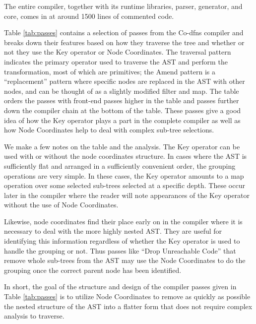 ﻿\documentclass[numbers,10pt,preprint]{sigplanconf}
\begin{document}
The entire compiler, together with its runtime libraries, parser, generator, and core, comes in at around 1500 lines of commented code.

Table \ref{tab:passes} contains a selection of passes from the Co-dfns compiler and breaks down their features based on how they traverse the tree and whether or not they use the Key operator or Node Coordinates. The traversal pattern indicates the primary operator used to traverse the AST and perform the transformation, most of which are primitives; the Amend pattern is a ``replacement'' pattern where specific nodes are replaced in the AST with other nodes, and can be thought of as a slightly modified filter and map. The table orders the passes with front-end passes higher in the table and passes further down the compiler chain at the bottom of the table. These passes give a good idea of how the Key operator plays a part in the complete compiler as well as how Node Coordinates help to deal with complex sub-tree selections.

We make a few notes on the table and the analysis. The Key operator can be used with or without the node coordinates structure. In cases where the AST is sufficiently flat and arranged in a sufficiently convenient order, the grouping operations are very simple. In these cases, the Key operator amounts to a map operation over some selected sub-trees selected at a specific depth. These occur later in the compiler where the reader will note appearances of the Key operator without the use of Node Coordinates.

Likewise, node coordinates find their place early on in the compiler where it is necessary to deal with the more highly nested AST. They are useful for identifying this information regardless of whether the Key operator is used to handle the grouping or not. Thus passes like ``Drop Unreachable Code'' that remove whole sub-trees from the AST may use the Node Coordinates to do the grouping once the correct parent node has been identified.

In short, the goal of the structure and design of the compiler passes given in Table \ref{tab:passes} is to utilize Node Coordinates to remove as quickly as possible the nested structure of the AST into a flatter form that does not require complex analysis to traverse.
\end{document}
